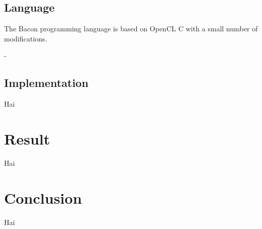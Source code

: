 \documentclass{llncs}
\begin{document}
\subsection{Language}

The Bacon programming language is based on OpenCL C with a small
number of modifications. 

- 


\subsection{Implementation}

Hai

\section{Result}

Hai

\section{Conclusion}

Hai

{}

\end{document}
